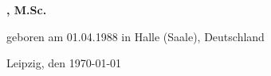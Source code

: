 \begin{titlepage}
\begin{addmargin}[-1cm]{-3cm}
\begin{center}
        \textbf{\myName, M.Sc.} \\\vfill
        
        geboren am 01.04.1988 in Halle (Saale), Deutschland \\\vfill
        
        Leipzig, den \today\vfill



        

        
%        
%
%

    \end{center}  
  \end{addmargin}       
\end{titlepage}   